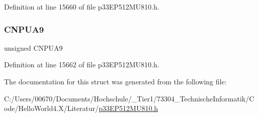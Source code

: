 Definition at line 15660 of file p33\+E\+P512\+M\+U810.\+h.

\mbox{\label{structtag_c_n_p_u_a_b_i_t_s_af93794815b239983326794054916ee7a}} 
\subsubsection{\texorpdfstring{C\+N\+P\+U\+A9}{CNPUA9}}
{\footnotesize\ttfamily unsigned C\+N\+P\+U\+A9}



Definition at line 15662 of file p33\+E\+P512\+M\+U810.\+h.



The documentation for this struct was generated from the following file\+:\begin{DoxyCompactItemize}
\item 
C\+:/\+Users/00670/\+Documents/\+Hochschule/\+\_\+\+Tier1/73304\+\_\+\+Technische\+Informatik/\+Code/\+Hello\+World4.\+X/\+Literatur/\hyperlink{p33_e_p512_m_u810_8h}{p33\+E\+P512\+M\+U810.\+h}\end{DoxyCompactItemize}
